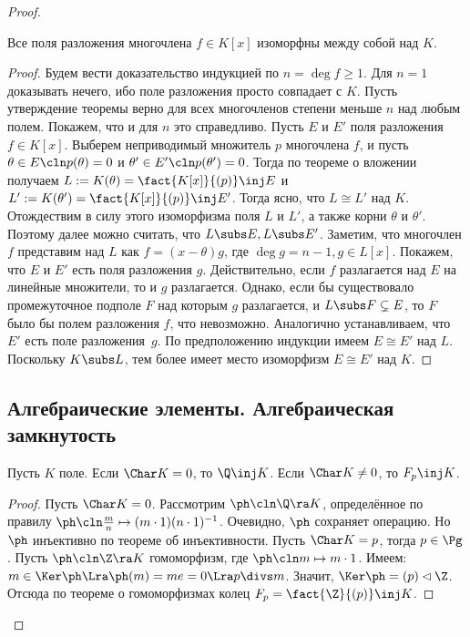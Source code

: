 \documentclass[a4paper]{article}
\newcommand{\kph}{\Ker \ph}
\begin{document}
\begin{proof}
\begin{theorem}
Все поля разложения многочлена $f \in K[x]$ изоморфны между собой над $K$.
\end{theorem}
\begin{proof}
Будем вести доказательство индукцией по $n=\deg f \ge 1$. Для $n=1$ доказывать  нечего, ибо поле разложения
просто совпадает с $K$. Пусть утверждение теоремы верно для всех многочленов степени меньше $n$ над любым
полем. Покажем, что и для $n$ это справедливо. Пусть $E$ и $E'$ поля разложения $f \in K[x]$. Выберем
неприводимый множитель $p$ многочлена $f$, и пусть $\theta \in E\cln p(\theta)=0$ и $\theta' \in E'\cln
p(\theta')=0$. Тогда по теореме о вложении получаем $L := K(\theta)=\fact{K[x]}{(p)} \inj E$ и
$L':=K(\theta')=\fact{K[x]}{(p)} \inj E'$. Тогда ясно, что $L\cong L'$ над $K$. Отождествим в силу этого
изоморфизма поля $L$ и $L'$, а также корни $\theta$ и $\theta'$. Поэтому далее можно считать, что $L \subs E,
L \subs E'$. Заметим, что многочлен $f$ представим над $L$ как $f=(x-\theta)g$, где $\deg g = n-1, g \in
L[x]$. Покажем, что $E$ и $E'$ есть поля разложения $g$. Действительно, если $f$ разлагается над $E$ на
линейные множители, то и $g$ разлагается. Однако, если бы существовало промежуточное подполе $F$ над которым
$g$ разлагается, и $L \subs F \subsetneq E$, то $F$ было бы полем разложения $f$, что невозможно. Аналогично
устанавливаем, что $E'$ есть поле разложения~$g$. По предположению индукции имеем $E \cong E'$ над $L$.
Поскольку $K \subs L$, тем более имеет место изоморфизм $E \cong E'$ над $K$.
\end{proof}

\subsection{Алгебраические элементы. Алгебраическая замкнутость}

\begin{theorem}
Пусть $K$ поле. Если $\Char K = 0$, то $\Q \inj K$. Если $\Char K \neq 0$, то $F_p \inj K$.
\end{theorem}
\begin{proof}
Пусть $\Char K = 0$. Рассмотрим $\ph\cln \Q \ra K$, определённое по правилу  $\ph\cln \frac{m}{n} \mapsto (m\cdot
1)(n\cdot 1)^{-1}$. Очевидно, $\ph$ сохраняет операцию. Но $\ph$ инъективно по теореме об инъективности.
Пусть $\Char K = p$, тогда $p \in \Pg$. Пусть $\ph\cln \Z \ra K$ гомоморфизм, где $\ph\cln m \mapsto m \cdot 1$.
Имеем: $m \in \kph \Lra \ph(m)=me=0 \Lra p \divs m$. Значит, $\kph = (p) \lhd \Z$. Отсюда по теореме о
гомоморфизмах колец $F_p = \fact{\Z}{(p)} \inj K$.
\end{proof}


\end{proof}
\end{document}
